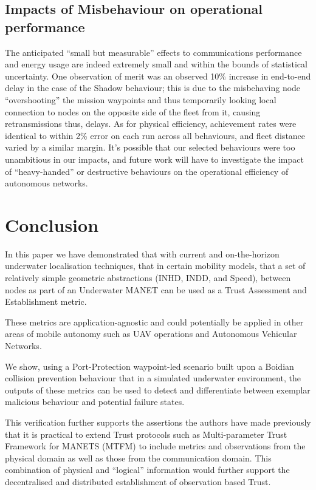 \documentclass[conference,compsoc,letterpaper]{IEEEtran}
\begin{document}
\subsection{Impacts of Misbehaviour on operational performance}
The anticipated ``small but measurable'' effects to communications performance and energy usage are indeed extremely small and within the bounds of statistical uncertainty.
One observation of merit was an observed 10\% increase in end-to-end delay in the case of the Shadow behaviour; this is due to the misbehaving node ``overshooting'' the mission waypoints and thus temporarily looking local connection to nodes on the opposite side of the fleet from it, causing retransmissions thus, delays.
As for physical efficiency, achievement rates were identical to within 2\% error on each run across all behaviours, and fleet distance varied by a similar margin.
It's possible that our selected behaviours were too unambitious in our impacts, and future work will have to investigate the impact of ``heavy-handed'' or destructive behaviours on the operational efficiency of autonomous networks.

\section{Conclusion}
In this paper we have demonstrated that with current and on-the-horizon underwater localisation techniques, that in certain mobility models, that a set of relatively simple geometric abstractions (INHD, INDD, and Speed), between nodes as part of an Underwater MANET can be used as a Trust Assessment and Establishment metric.

These metrics are application-agnostic and could potentially be applied in other areas of mobile autonomy such as UAV operations and Autonomous Vehicular Networks.

We show, using a Port-Protection waypoint-led scenario built upon a Boidian collision prevention behaviour that in a simulated underwater environment, the outputs of these metrics can be used to detect and differentiate between exemplar malicious behaviour and potential failure states.

This verification further supports the assertions the authors have made previously that it is practical to extend Trust protocols such as Multi-parameter Trust Framework for MANETS (MTFM)\cite{Guo2012} to include metrics and observations from the physical domain as well as those from the communication domain\cite{Bolster2014}.
This combination of physical and ``logical'' information would further support the decentralised and distributed establishment of observation based Trust.
\end{document}
